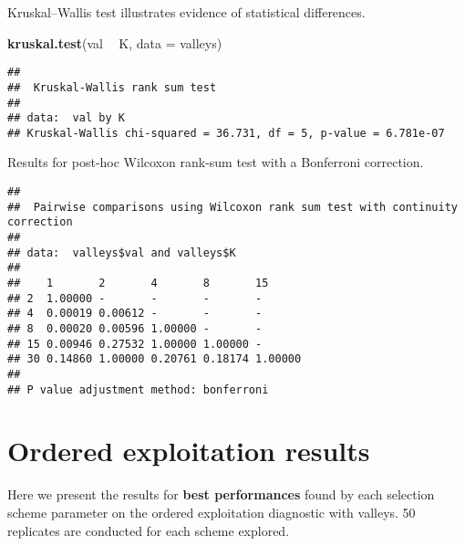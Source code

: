 \documentclass[]{book}
\newenvironment{Shaded}{\begin{snugshade}}{\end{snugshade}}
\newcommand{\DataTypeTok}[1]{\textcolor[rgb]{0.13,0.29,0.53}{#1}}
\newcommand{\KeywordTok}[1]{\textcolor[rgb]{0.13,0.29,0.53}{\textbf{#1}}}
\newcommand{\NormalTok}[1]{#1}
\newcommand{\OperatorTok}[1]{\textcolor[rgb]{0.81,0.36,0.00}{\textbf{#1}}}
\newcommand{\OtherTok}[1]{\textcolor[rgb]{0.56,0.35,0.01}{#1}}
\newcommand{\StringTok}[1]{\textcolor[rgb]{0.31,0.60,0.02}{#1}}
\begin{document}
Kruskal--Wallis test illustrates evidence of statistical differences.

\begin{Shaded}
\begin{Highlighting}[]
\KeywordTok{kruskal.test}\NormalTok{(val }\OperatorTok{~}\StringTok{ }\NormalTok{K, }\DataTypeTok{data =}\NormalTok{ valleys)}
\end{Highlighting}
\end{Shaded}

\begin{verbatim}
## 
##  Kruskal-Wallis rank sum test
## 
## data:  val by K
## Kruskal-Wallis chi-squared = 36.731, df = 5, p-value = 6.781e-07
\end{verbatim}

Results for post-hoc Wilcoxon rank-sum test with a Bonferroni correction.

\begin{Shaded}
\end{Shaded}

\begin{verbatim}
## 
##  Pairwise comparisons using Wilcoxon rank sum test with continuity correction 
## 
## data:  valleys$val and valleys$K 
## 
##    1       2       4       8       15     
## 2  1.00000 -       -       -       -      
## 4  0.00019 0.00612 -       -       -      
## 8  0.00020 0.00596 1.00000 -       -      
## 15 0.00946 0.27532 1.00000 1.00000 -      
## 30 0.14860 1.00000 0.20761 0.18174 1.00000
## 
## P value adjustment method: bonferroni
\end{verbatim}

\hypertarget{ordered-exploitation-results-5}{%
\section{Ordered exploitation results}\label{ordered-exploitation-results-5}}

Here we present the results for \textbf{best performances} found by each selection scheme parameter on the ordered exploitation diagnostic with valleys.
50 replicates are conducted for each scheme explored.
\end{document}
